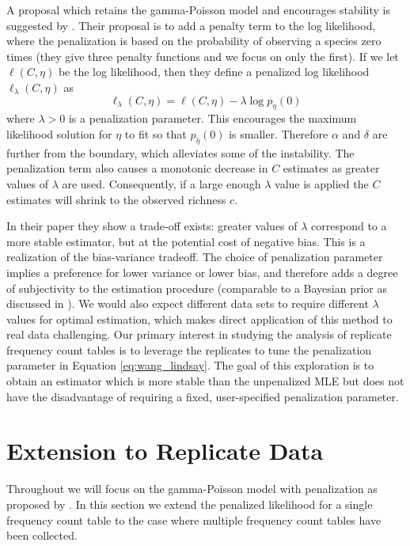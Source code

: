 \documentclass[oupdraft]{bio}
\begin{document}
A proposal which retains the gamma-Poisson model and encourages stability is suggested by \citet{wang_2005}.  Their proposal is to add a penalty term to the log likelihood, where the penalization is based on the probability of observing a species zero times (they give three penalty functions and we focus on only the first).  If we let $\ell(C,\eta)$ be the log likelihood, then they define a penalized log likelihood $\ell_{\lambda}(C, \eta)$ as
\begin{equation}
\ell_\lambda(C, \eta) = \ell(C,\eta) - \lambda \log p_{\eta}(0)
\label{eq:wang_lindsay}
\end{equation}
where $\lambda > 0$ is a penalization parameter.  This encourages the maximum likelihood solution for $\eta$ to fit so that $p_{\widehat{\eta}}(0)$ is smaller.  Therefore $\alpha$ and $\delta$ are further from the boundary, which alleviates some of the instability. The penalization term also causes a monotonic decrease in $C$ estimates as greater values of $\lambda$ are used.  Consequently, if a large enough $\lambda$ value is applied the $C$ estimates will shrink to the observed richness $c$.  

In their paper they show a trade-off exists: greater values of $\lambda$ correspond to a more stable estimator, but at the potential cost of negative bias.  This is a realization of the bias-variance tradeoff. 
The choice of penalization parameter implies a preference for lower variance or lower bias, and therefore adds a degree of subjectivity to the estimation procedure (comparable to a Bayesian prior as discussed in \citet{wang_2005}).  We would also expect different data sets to require different $\lambda$ values for optimal estimation, which makes direct application of this method to real data challenging.  Our primary interest in studying the analysis of replicate frequency count tables is to leverage the replicates to tune the penalization parameter in Equation \ref{eq:wang_lindsay}.  The goal of this exploration is to obtain an estimator which is more stable than the unpenalized MLE but does not have the disadvantage of requiring a fixed, user-specified penalization parameter.


\section{Extension to Replicate Data}
\label{sec:fixed_lambda}

Throughout we will focus on the gamma-Poisson model with penalization as proposed by \citet{wang_2005}.  In this section we extend the penalized likelihood for a single frequency count table to the case where multiple frequency count tables have been collected.
 
\end{document}
